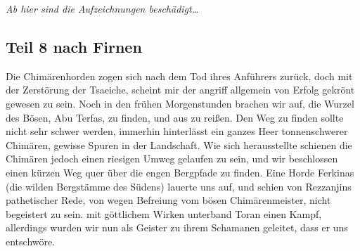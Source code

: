 \emph{Ab hier sind die Aufzeichnungen beschädigt\dots}

\subsection{Teil 8 nach Firnen}

Die Chimärenhorden zogen sich nach dem Tod ihres Anführers zurück, doch mit der Zerstörung der Tsaeiche, scheint mir der angriff allgemein von Erfolg gekrönt gewesen zu sein. Noch in den frühen Morgenstunden brachen wir auf, die Wurzel des Bösen, Abu Terfas, zu finden, und aus zu reißen. Den Weg zu finden sollte nicht sehr schwer werden, immerhin hinterlässt ein ganzes Heer tonnenschwerer Chimären, gewisse Spuren in der Landschaft.
Wie sich herausstellte schienen die Chimären jedoch einen riesigen Umweg gelaufen zu sein, und wir beschlossen einen kürzen Weg quer über die engen Bergpfade zu finden.
Eine Horde Ferkinas (die wilden Bergstämme des Südens) lauerte uns auf, und schien von Rezzanjins pathetischer Rede, von wegen Befreiung vom bösen Chimärenmeister, nicht begeistert zu sein. mit göttlichem Wirken unterband Toran einen Kampf, allerdings wurden wir nun als Geister zu ihrem Schamanen geleitet, dass er uns entschwöre.
